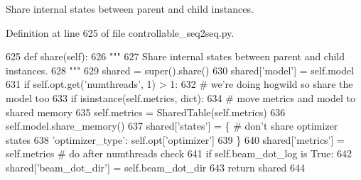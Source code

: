 \begin{DoxyVerb}Share internal states between parent and child instances.
\end{DoxyVerb}
 

Definition at line 625 of file controllable\+\_\+seq2seq.\+py.


\begin{DoxyCode}
625     \textcolor{keyword}{def }share(self):
626         \textcolor{stringliteral}{"""}
627 \textcolor{stringliteral}{        Share internal states between parent and child instances.}
628 \textcolor{stringliteral}{        """}
629         shared = super().share()
630         shared[\textcolor{stringliteral}{'model'}] = self.model
631         \textcolor{keywordflow}{if} self.opt.get(\textcolor{stringliteral}{'numthreads'}, 1) > 1:
632             \textcolor{comment}{# we're doing hogwild so share the model too}
633             \textcolor{keywordflow}{if} isinstance(self.metrics, dict):
634                 \textcolor{comment}{# move metrics and model to shared memory}
635                 self.metrics = SharedTable(self.metrics)
636                 self.model.share\_memory()
637             shared[\textcolor{stringliteral}{'states'}] = \{  \textcolor{comment}{# don't share optimizer states}
638                 \textcolor{stringliteral}{'optimizer\_type'}: self.opt[\textcolor{stringliteral}{'optimizer'}]
639             \}
640         shared[\textcolor{stringliteral}{'metrics'}] = self.metrics  \textcolor{comment}{# do after numthreads check}
641         \textcolor{keywordflow}{if} self.beam\_dot\_log \textcolor{keywordflow}{is} \textcolor{keyword}{True}:
642             shared[\textcolor{stringliteral}{'beam\_dot\_dir'}] = self.beam\_dot\_dir
643         \textcolor{keywordflow}{return} shared
644 
\end{DoxyCode}
\mbox{\label{classprojects_1_1controllable__dialogue_1_1controllable__seq2seq_1_1controllable__seq2seq_1_1ControllableSeq2seqAgent_a656ea2270ec3d407d67782754ead5f87}} 
